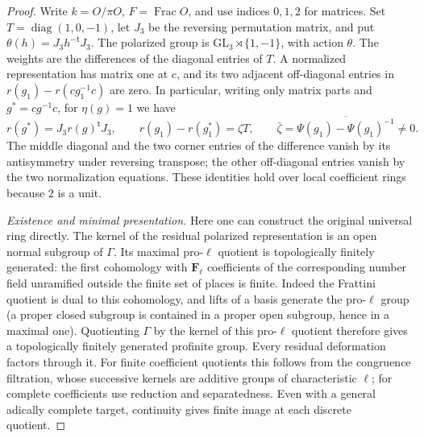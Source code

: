 \begin{proof}
Write $k=O/\pi O$, $F=\operatorname{Frac}O$, and use indices
$0,1,2$ for matrices. Set $T=\operatorname{diag}(1,0,-1)$,
let $J_3$ be the reversing permutation matrix, and put
$\theta(h)=J_3h^{-\mathsf t}J_3$.
The polarized group is $\mathrm{GL}_3\rtimes\{1,-1\}$,
with action $\theta$. The weights are the differences of the
diagonal entries of $T$. A normalized representation has matrix
one at $c$, and its two adjacent off-diagonal entries in
$r(g_1)-r(cg_1^{-1}c)$ are zero. In particular, writing only
matrix parts and $g^*=cg^{-1}c$, for $\eta(g)=1$ we have
\[
 r(g^*)=J_3r(g)^{\mathsf t}J_3,\qquad
 r(g_1)-r(g_1^*)=\zeta T,\qquad
 \bar\zeta=\overline{\Psi(g_1)-\Psi(g_1)^{-1}}\ne0.             \tag{DC3}
\]
The middle diagonal and the two corner entries of the difference
vanish by its antisymmetry under reversing transpose; the other
off-diagonal entries vanish by the two normalization equations.
These identities hold over local coefficient rings because $2$
is a unit.

\emph{Existence and minimal presentation.}
Here one can construct the original universal ring directly.
The kernel of the residual polarized representation is an open
normal subgroup of $\Gamma$. Its maximal pro-$\ell$ quotient is
topologically finitely generated: the first cohomology with
$\mathbf F_\ell$ coefficients of the corresponding number field
unramified outside the finite set of places is finite. Indeed the
Frattini quotient is dual to this cohomology, and lifts of a basis
generate the pro-$\ell$ group (a proper closed subgroup is
contained in a proper open subgroup, hence in a maximal one).
Quotienting $\Gamma$ by the kernel of this pro-$\ell$ quotient
therefore gives a topologically finitely generated profinite group.
Every residual deformation factors through it. For finite
coefficient quotients this follows from the congruence filtration,
whose successive kernels are additive groups of characteristic
$\ell$; for complete coefficients use reduction and separatedness.
Even with a general adically complete target, continuity gives
finite image at each discrete quotient.


\end{proof}
